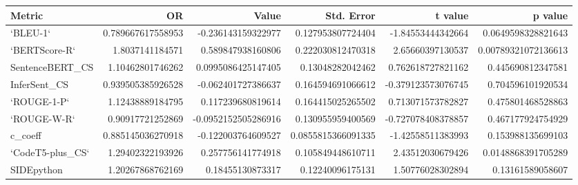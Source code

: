 \begin{tabular}{lrrrrr}
\hline
Metric & OR & Value & Std. Error & t value & p value
\\
\hline
`BLEU-1` & 0.789667617558953 & -0.236143159322977 & 0.127953807724404 & -1.84553444342664 & 0.0649598328821643
\\
`BERTScore-R` & 1.8037141184571 & 0.589847938160806 & 0.222030812470318 & 2.65660397130537 & 0.00789321072136613
\\
SentenceBERT\_CS & 1.10462801746262 & 0.0995086425147405 & 0.13048282042462 & 0.762618727821162 & 0.445690812347581
\\
InferSent\_CS & 0.939505385926528 & -0.062401727386637 & 0.164594691066612 & -0.379123573076745 & 0.704596101920534
\\
`ROUGE-1-P` & 1.12438889184795 & 0.117239680819614 & 0.164415025265502 & 0.713071573782827 & 0.475801468528863
\\
`ROUGE-W-R` & 0.90917721252869 & -0.0952152505286916 & 0.130955959400569 & -0.727078408378857 & 0.467177924754929
\\
c\_coeff & 0.885145036270918 & -0.122003764609527 & 0.0855815366091335 & -1.42558511383993 & 0.153988135699103
\\
`CodeT5-plus\_CS` & 1.29402322193926 & 0.257756141774918 & 0.105849448610711 & 2.43512030679426 & 0.0148868391705289
\\
SIDEpython & 1.20267868762169 & 0.18455130873317 & 0.12240096175131 & 1.50776028302894 & 0.13161589058607
\\
\hline
\end{tabular}
